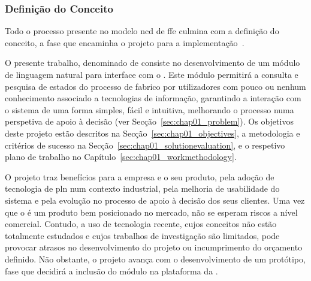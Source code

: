 \subsubsection{Definição do Conceito}
Todo o processo presente no modelo \gls{ncd} de \gls{ffe} culmina com a definição do conceito, a fase que encaminha o projeto para a implementação~\parencite{ffe_effectivemethods_tools_techniques}.

O presente trabalho, denominado de  consiste no desenvolvimento de um módulo de linguagem natural para interface com o {\productname}. Este módulo permitirá a consulta e pesquisa de estados do processo de fabrico por utilizadores com pouco ou nenhum conhecimento associado a tecnologias de informação, garantindo a interação com o sistema de uma forma simples, fácil e intuitiva, melhorando o processo numa perspetiva de apoio à decisão (ver Secção~\ref{sec:chap01_problem}). Os objetivos deste projeto estão descritos na Secção~\ref{sec:chap01_objectives}, a metodologia e critérios de sucesso na Secção~\ref{sec:chap01_solutionevaluation}, e o respetivo plano de trabalho no Capítulo~\ref{sec:chap01_workmethodology}.

O projeto traz benefícios para a empresa e o seu produto, pela adoção de tecnologia de \gls{pln} num contexto industrial, pela melhoria de usabilidade do sistema e pela evolução no processo de apoio à decisão dos seus clientes. Uma vez que o {\productname} é um produto bem posicionado no mercado, não se esperam riscos a nível comercial. Contudo, a uso de tecnologia recente, cujos conceitos não estão totalmente estudados e cujos trabalhos de investigação são limitados, pode provocar atrasos no desenvolvimento do projeto ou incumprimento do orçamento definido. Não obstante, o projeto avança com o desenvolvimento de um protótipo, fase que decidirá a inclusão do módulo na plataforma da {\companyname}.
